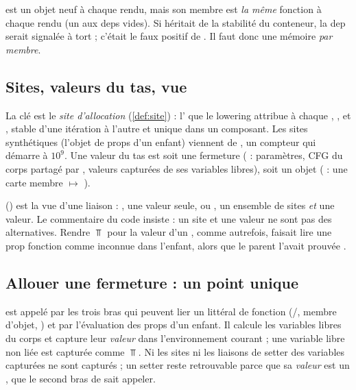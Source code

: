  est un objet neuf à chaque rendu, mais son membre 
est \emph{la même} fonction à chaque rendu (un  aux deps
vides). Si  héritait de la stabilité du conteneur, la dep
 serait signalée à tort ; c'était le faux positif de
. Il faut donc une mémoire \emph{par membre}.

\subsection{Sites, valeurs du tas, vue }


La clé est le \emph{site d'allocation} (\cref{def:site}) : l'
que le lowering attribue à chaque , ,
 et , stable d'une itération à l'autre et unique dans
un composant. Les sites synthétiques (l'objet de props d'un enfant) viennent
de , un compteur qui démarre à $10^9$. Une valeur du
tas est soit une fermeture ( : paramètres, CFG du corps partagé par
, valeurs capturées de ses variables libres), soit un objet
( : une carte membre $\mapsto$ ).

 () est la vue
d'une liaison : , une valeur seule, ou ,
un ensemble de sites \emph{et} une valeur. Le commentaire du code insiste :
un site et une valeur ne sont pas des alternatives. Rendre $\Top$ pour la
valeur d'un , comme autrefois, faisait lire une prop fonction comme
\og inconnue\fg{} dans l'enfant, alors que le parent l'avait prouvée
.

\subsection{Allouer une fermeture : un point unique}


 est appelé par les trois bras qui peuvent lier un littéral de
fonction (/, membre d'objet, ) et par
l'évaluation des props d'un enfant. Il calcule les variables libres du corps
et capture leur \emph{valeur} dans l'environnement courant ; une variable
libre non liée est capturée comme $\Top$. Ni les sites ni les liaisons de
setter des variables capturées ne sont capturés ; un setter reste retrouvable
parce que sa \emph{valeur} est un , que
le second bras de  sait appeler.

